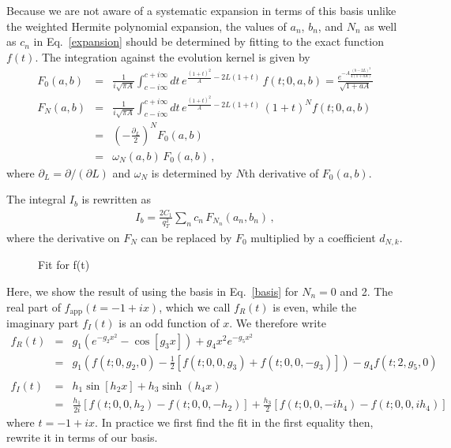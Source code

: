 \documentclass[a4,letterpaper,11pt]{article}
\newcommand{\nn}{\nonumber}
\newcommand{\bea}{\begin{eqnarray}}
\newcommand{\eea}{\end{eqnarray}}
\newcommand{\eq}[1]{Eq.~\eqref{#1}}
\begin{document}
Because we are not aware of a systematic expansion in terms of this basis unlike the weighted Hermite polynomial expansion, the values of $a_n$, $b_n$, and $N_n$ as well as $c_n$ in \eq{expansion} should be determined by fitting to the exact function $f(t)$.
The integration against the evolution kernel is given by
\bea \label{intbasis}
F_{0}(a,b) &=& \frac{1}{i\sqrt{\pi A}} \int_{c-i \infty}^{c+i \infty} dt\,  e^{ \frac{(1+t)^2}{A}-2L (1+t) }\, f(t; 0, a,b)
				= \frac{ e^{-A\frac{\left(b-2L\right)^2}{4(1+a A)}} }{\sqrt{1+a A}}  
\nn\\
F_{N}(a,b) &=& \frac{1}{i\sqrt{\pi A}} \int_{c-i \infty}^{c+i \infty} dt\,  e^{ \frac{(1+t)^2}{A}-2L (1+t) }\, (1+t)^{N}f(t; 0,a,b)
\nn\\
				&=& \left(-\frac{\partial_L}{2}\right)^{N}  F_{0}(a,b)
\nn\\
				&=& \omega_{N}(a,b) \, F_{0}(a,b)
\,,\eea
where $\partial_L=\partial/(\partial L)$ and $\omega_{N}$ is determined by $N$th derivative of $ F_{0}(a,b)$.

The integral $I_b$ is rewritten as
\bea
 I_b = \frac{ 2 C_1}{q_T^2} \sum_{n} c_n \, F_{N_n}(a_n,b_n) 
\,,
\eea
where the derivative on $F_{N}$ can be replaced by $F_0$ multiplied by a coefficient $d_{N,k}$.

\begin{figure}
\centerline{}
\vskip-0.2cm
\caption[1]{Fit for f(t)}
\label{fit} 
\end{figure}


Here, we show the result of using the basis in \eq{basis} for $N_n=$0 and 2.
The real part of $f_\text{app}(t=-1+ix)$, which we call $f_R(t)$ is even, while the imaginary part $f_I(t) $ is an odd function of $x$. We therefore write 
\bea
f_R(t) &=&  g_1(e^{-g_2 x^2}- \cos[g_3x]) + g_4x^2 e^{-g_5 x^2}
\nn\\
&=&  g_1\left(f(t;0,g_2,0) -\frac 12 [f(t;0,0,g_3)+f(t;0,0,-g_3)]\right) - g_4 f(t;2,g_5,0)
\\ \nn\\
f_I(t) &=& h_1 \sin[h_2 x] +h_3 \sinh (h_4 x)\nn\\   
&=&   \frac{h_1}{2i} \left[ f(t;0,0,h_2)-f(t;0,0,-h_2)\right] +\frac{h_3}{2} \left[ f(t;0,0,-i h_4)-f(t;0,0,ih_4)\right] 
\label{fit}
\eea   
where $t=-1+ix$. In practice we first find the fit in the first equality then, rewrite it in terms of our basis.
\end{document}
